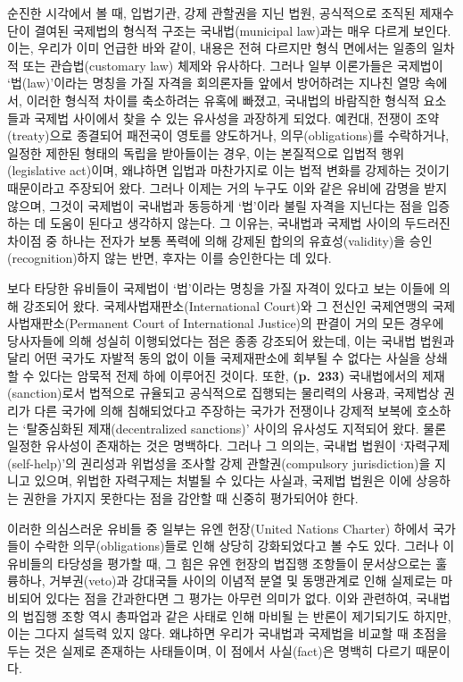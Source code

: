 순진한 시각에서 볼 때, 입법기관, 강제 관할권을 지닌 법원, 공식적으로
조직된 제재수단이 결여된 국제법의 형식적 구조는 국내법(municipal
law)과는 매우 다르게 보인다. 이는, 우리가 이미 언급한 바와 같이, 내용은
전혀 다르지만 형식 면에서는 일종의 일차적 또는 관습법(customary law)
체제와 유사하다. 그러나 일부 이론가들은 국제법이 `법(law)'이라는 명칭을
가질 자격을 회의론자들 앞에서 방어하려는 지나친 열망 속에서, 이러한
형식적 차이를 축소하려는 유혹에 빠졌고, 국내법의 바람직한 형식적
요소들과 국제법 사이에서 찾을 수 있는 유사성을 과장하게 되었다. 예컨대,
전쟁이 조약(treaty)으로 종결되어 패전국이 영토를 양도하거나,
의무(obligations)를 수락하거나, 일정한 제한된 형태의 독립을 받아들이는
경우, 이는 본질적으로 입법적 행위(legislative act)이며, 왜냐하면 입법과
마찬가지로 이는 법적 변화를 강제하는 것이기 때문이라고 주장되어 왔다.
그러나 이제는 거의 누구도 이와 같은 유비에 감명을 받지 않으며, 그것이
국제법이 국내법과 동등하게 `법'이라 불릴 자격을 지닌다는 점을 입증하는
데 도움이 된다고 생각하지 않는다. 그 이유는, 국내법과 국제법 사이의
두드러진 차이점 중 하나는 전자가 보통 폭력에 의해 강제된 합의의
유효성(validity)을 승인(recognition)하지 않는 반면, 후자는 이를
승인한다는 데 있다.

보다 타당한 유비들이 국제법이 `법'이라는 명칭을 가질 자격이 있다고 보는
이들에 의해 강조되어 왔다. 국제사법재판소(International Court)와 그
전신인 국제연맹의 국제사법재판소(Permanent Court of International
Justice)의 판결이 거의 모든 경우에 당사자들에 의해 성실히 이행되었다는
점은 종종 강조되어 왔는데, 이는 국내법 법원과 달리 어떤 국가도 자발적
동의 없이 이들 국제재판소에 회부될 수 없다는 사실을 상쇄할 수 있다는
암묵적 전제 하에 이루어진 것이다. 또한, \textbf{(p.~233)} 국내법에서의
제재(sanction)로서 법적으로 규율되고 공식적으로 집행되는 물리력의
사용과, 국제법상 권리가 다른 국가에 의해 침해되었다고 주장하는 국가가
전쟁이나 강제적 보복에 호소하는 `탈중심화된 제재(decentralized
sanctions)' 사이의 유사성도 지적되어 왔다. 물론 일정한 유사성이 존재하는
것은 명백하다. 그러나 그 의의는, 국내법 법원이 `자력구제(self-help)'의
권리성과 위법성을 조사할 강제 관할권(compulsory jurisdiction)을 지니고
있으며, 위법한 자력구제는 처벌될 수 있다는 사실과, 국제법 법원은 이에
상응하는 권한을 가지지 못한다는 점을 감안할 때 신중히 평가되어야 한다.

이러한 의심스러운 유비들 중 일부는 유엔 헌장(United Nations Charter)
하에서 국가들이 수락한 의무(obligations)들로 인해 상당히 강화되었다고 볼
수도 있다. 그러나 이 유비들의 타당성을 평가할 때, 그 힘은 유엔 헌장의
법집행 조항들이 문서상으로는 훌륭하나, 거부권(veto)과 강대국들 사이의
이념적 분열 및 동맹관계로 인해 실제로는 마비되어 있다는 점을 간과한다면
그 평가는 아무런 의미가 없다. 이와 관련하여, 국내법의 법집행 조항 역시
총파업과 같은 사태로 인해 마비될 는 반론이
제기되기도 하지만, 이는 그다지 설득력 있지 않다. 왜냐하면 우리가
국내법과 국제법을 비교할 때 초점을 두는 것은 실제로 존재하는 사태들이며,
이 점에서 사실(fact)은 명백히 다르기 때문이다.

